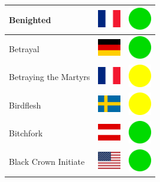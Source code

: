 \documentclass[12pt, a4paper, twoside]{report}
\begin{document}
\begin{center}
\begin{longtable}{|p{5cm}|p{2cm}|p{2cm}|}
Benighted & \includegraphics[width=1cm]{4x3/fr} & \includegraphics[width=1cm]{likes/y} \\ \hline
Betrayal & \includegraphics[width=1cm]{4x3/de} & \includegraphics[width=1cm]{likes/y} \\ \hline
Betraying the Martyrs & \includegraphics[width=1cm]{4x3/fr} & \includegraphics[width=1cm]{likes/m} \\ \hline
Birdflesh & \includegraphics[width=1cm]{4x3/se} & \includegraphics[width=1cm]{likes/m} \\ \hline
Bitchfork & \includegraphics[width=1cm]{4x3/at} & \includegraphics[width=1cm]{likes/y} \\ \hline
Black Crown Initiate & \includegraphics[width=1cm]{4x3/us} & \includegraphics[width=1cm]{likes/y} \\ \hline

\end{longtable}
\end{center}
\end{document}
